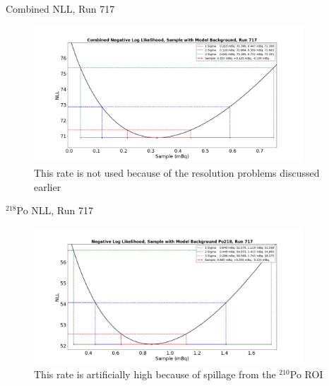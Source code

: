 \documentclass[aspectratio=169]{beamer}
\begin{document}
\begin{frame}{Combined NLL, Run 717}
    \begin{figure}
        \begin{center}
            \includegraphics[width=0.9\textwidth]
            {assets/717/comNLL.png}
            \caption{This rate is not used because of the resolution problems discussed earlier}
        \end{center}
    \end{figure}
\end{frame}

\begin{frame}{$^{218}$Po NLL, Run 717}
    \begin{figure}
        \begin{center}
            \includegraphics[width=0.9\textwidth]
            {assets/717/NLL218.png}
            \caption{This rate is artificially high because of spillage from the $^{210}$Po ROI}
        \end{center}
    \end{figure}
\end{frame}
\end{document}
